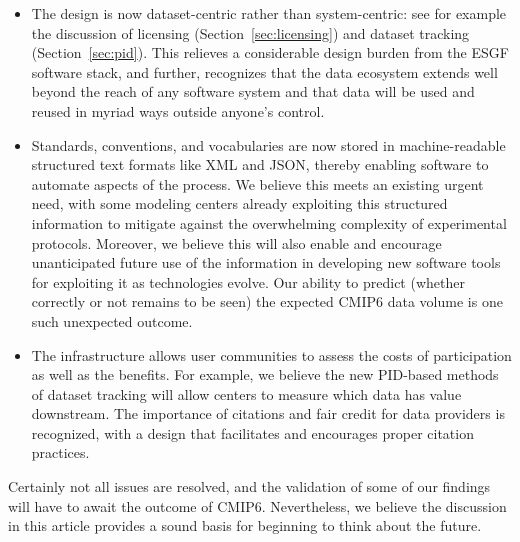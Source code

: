 \documentclass[gmd,manuscript]{copernicus}
\newcommand{\secref}[1] {\mbox{Section  \ref{sec:#1}}}
\begin{document}
\begin{itemize}
\item The design is now dataset-centric rather than system-centric:
  see for example the discussion of licensing (\secref{licensing}) and
  dataset tracking (\secref{pid}). This relieves a considerable design
  burden from the ESGF software stack, and further, recognizes that
  the data ecosystem extends well beyond the reach of any software
  system and that data will be used and reused in myriad ways outside
  anyone's control.
\item Standards, conventions, and vocabularies are now stored in
  machine-readable structured text formats like XML and JSON, thereby
  enabling software to automate aspects of the process. We believe
  this meets an existing urgent need, with some modeling centers
  already exploiting this structured information to mitigate against
  the overwhelming complexity of experimental protocols. Moreover, we
  believe this will also enable and encourage unanticipated future use
  of the information in developing new software tools for exploiting
  it as technologies evolve. Our ability to predict (whether correctly
  or not remains to be seen) the expected CMIP6 data volume is one
  such unexpected outcome.
\item The infrastructure allows user communities to assess the costs
  of participation as well as the benefits. For example, we believe
  the new PID-based methods of dataset tracking will allow centers to
  measure which data has value downstream. The importance of citations
  and fair credit for data providers is recognized, with a design that
  facilitates and encourages proper citation practices.
\end{itemize}

Certainly not all issues are resolved, and the validation of some of
our findings will have to await the outcome of CMIP6. Nevertheless, we
believe the discussion in this article provides a sound basis for
beginning to think about the future.
\end{document}
